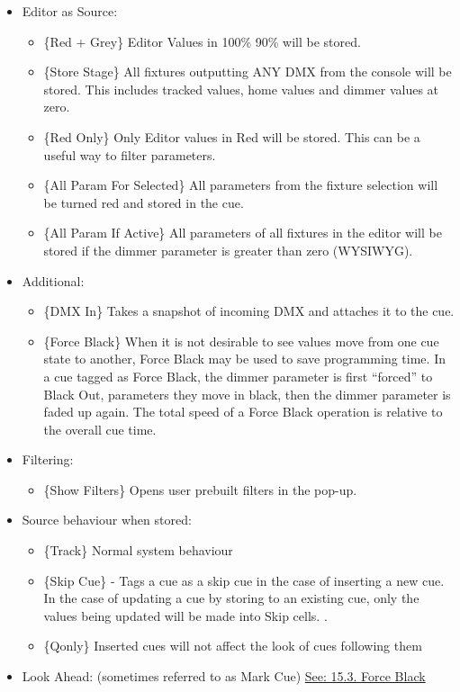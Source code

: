 \documentclass[
]{article}
\providecommand{\tightlist}{%
  \setlength{\itemsep}{0pt}\setlength{\parskip}{0pt}}
\begin{document}
\begin{itemize}
\tightlist
\item
  Editor as Source:

  \begin{itemize}
  \tightlist
  \item
    \{Red + Grey\} Editor Values in 100\% 90\% will be stored.
  \item
    \{Store Stage\} All fixtures outputting ANY DMX from the console will be stored. This includes tracked values, home values and dimmer values at zero.
  \item
    \{Red Only\} Only Editor values in Red will be stored. This can be a useful way to filter parameters.
  \item
    \{All Param For Selected\} All parameters from the fixture selection will be turned red and stored in the cue.
  \item
    \{All Param If Active\} All parameters of all fixtures in the editor will be stored if the dimmer parameter is greater than zero (WYSIWYG).
  \end{itemize}
\item
  Additional:

  \begin{itemize}
  \tightlist
  \item
    {\{DMX In\} Takes a snapshot of incoming DMX and attaches it to the cue. }
  \item
    \{Force Black\} When it is not desirable to see values move from one cue state to another, Force Black may be used to save programming time. In a cue tagged as Force Black, the dimmer parameter is first ``forced'' to Black Out, parameters they move in black, then the dimmer parameter is faded up again. The total speed of a Force Black operation is relative to the overall cue time.
  \end{itemize}
\item
  Filtering:

  \begin{itemize}
  \tightlist
  \item
    \{Show Filters\} Opens user prebuilt filters in the pop-up.
  \end{itemize}
\item
  Source behaviour when stored:

  \begin{itemize}
  \tightlist
  \item
    \{Track\} Normal system behaviour
  \item
    \{Skip Cue\} - {Tags a cue as a skip cue in the case of inserting a new cue. In the case of updating a cue by storing to an existing cue, only the values being updated will be made into Skip cells. }.
  \item
    {\{Qonly\} Inserted cues will not affect the look of cues following them}
  \end{itemize}
\item
  Look Ahead: (sometimes referred to as Mark Cue) \href{https://vibemanual.compulite.com/dark-parameter-positioning.html\#force-black}{See: 15.3. Force Black}


\end{itemize}
\end{document}
